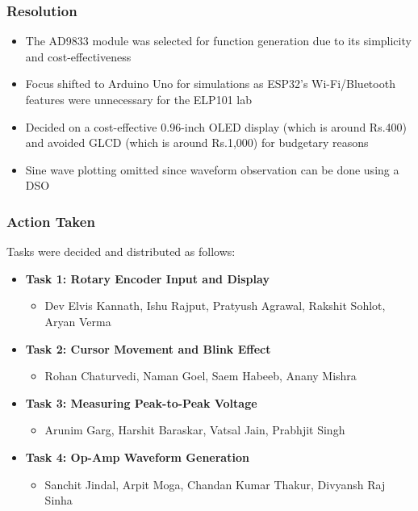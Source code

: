 \documentclass[12pt,a4paper]{article}
\begin{document}
\subsubsection*{Resolution}
\begin{itemize}
    \item The AD9833 module was selected for function generation due to its simplicity and cost-effectiveness
    \item Focus shifted to Arduino Uno for simulations as ESP32’s Wi-Fi/Bluetooth features were unnecessary for the ELP101 lab
    \item Decided on a cost-effective 0.96-inch OLED display (which is around Rs.400) and avoided GLCD (which is around Rs.1,000) for budgetary reasons
    \item Sine wave plotting omitted since waveform observation can be done using a DSO
\end{itemize}

\subsubsection*{Action Taken}
Tasks were decided and distributed as follows:
\begin{itemize}
    \item \textbf{Task 1: Rotary Encoder Input and Display} 
    \begin{itemize}
        \item Dev Elvis Kannath, Ishu Rajput, Pratyush Agrawal, Rakshit Sohlot, Aryan Verma
    \end{itemize}
    \item \textbf{Task 2: Cursor Movement and Blink Effect}
    \begin{itemize}
        \item Rohan Chaturvedi, Naman Goel, Saem Habeeb, Anany Mishra
    \end{itemize}
    \item \textbf{Task 3: Measuring Peak-to-Peak Voltage}
    \begin{itemize}
        \item Arunim Garg, Harshit Baraskar, Vatsal Jain, Prabhjit Singh
    \end{itemize}
    \item \textbf{Task 4: Op-Amp Waveform Generation}
    \begin{itemize}
        \item Sanchit Jindal, Arpit Moga, Chandan Kumar Thakur, Divyansh Raj Sinha
    \end{itemize}
\end{itemize}
\end{document}
